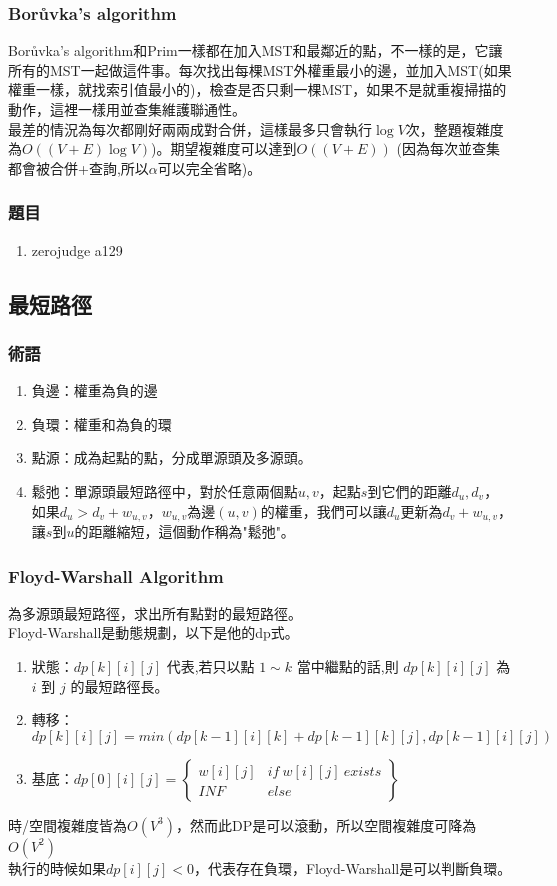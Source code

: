 \subsubsection{Borůvka’s algorithm}
Borůvka’s algorithm和Prim一樣都在加入MST和最鄰近的點，不一樣的是，它讓所有的MST一起做這件事。每次找出每棵MST外權重最小的邊，並加入MST(如果權重一樣，就找索引值最小的)，檢查是否只剩一棵MST，如果不是就重複掃描的動作，這裡一樣用並查集維護聯通性。\\
最差的情況為每次都剛好兩兩成對合併，這樣最多只會執行$\log V$次，整題複雜度為$O((V+E)\log V)$)。期望複雜度可以達到$O((V+E))$ (因為每次並查集都會被合併+查詢,所以$\alpha$可以完全省略)。
\subsubsection{題目}
\begin{enumerate}
\item zerojudge a129
\end{enumerate}
\subsection{最短路徑}
\subsubsection{術語}
\begin{enumerate}
\item 負邊：權重為負的邊
\item 負環：權重和為負的環
\item 點源：成為起點的點，分成單源頭及多源頭。
\item 鬆弛：單源頭最短路徑中，對於任意兩個點$u,v$，起點$s$到它們的距離$d_u,d_v$，如果$d_u>d_v+w_{u,v}$，$w_{u,v}$為邊$(u,v)$的權重，我們可以讓$d_u$更新為$d_v+w_{u,v}$，讓$s$到$u$的距離縮短，這個動作稱為"鬆弛"。 
\end{enumerate}
\subsubsection{Floyd-Warshall Algorithm}
為多源頭最短路徑，求出所有點對的最短路徑。\\
Floyd-Warshall是動態規劃，以下是他的dp式。
\begin{enumerate}
\item 狀態：$dp[k][i][j]$ 代表,若只以點 $1 ∼ k$ 當中繼點的話,則 $dp[k][i][j]$ 為 $i$ 到 $j$ 的最短路徑長。
\item 轉移：$dp[k][i][j] = min(dp[k − 1][i][k] + dp[k − 1][k][j], dp[k − 1][i][j])$
\item 基底：$dp[0][i][j] = \left\{ \begin{array}{cc}
w[i][j] & if\ w[i][j]\ exists\\
INF & else
\end{array} \right\}$
\end{enumerate}
時/空間複雜度皆為$O(V^3)$，然而此DP是可以滾動，所以空間複雜度可降為$O(V^2)$\\

執行的時候如果$dp[i][j]<0$，代表存在負環，Floyd-Warshall是可以判斷負環。
